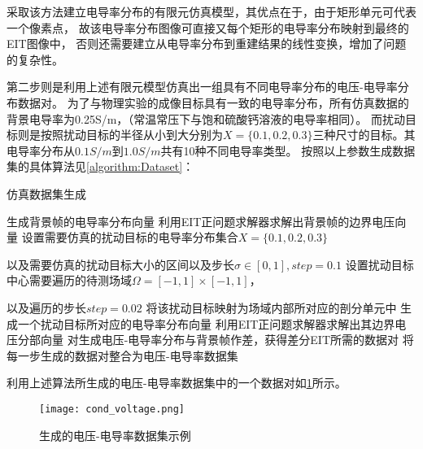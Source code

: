 采取该方法建立电导率分布的有限元仿真模型，其优点在于，由于矩形单元可代表一个像素点，
故该电导率分布图像可直接又每个矩形的电导率分布映射到最终的EIT图像中，
否则还需要建立从电导率分布到重建结果的线性变换，增加了问题的复杂性。

第二步则是利用上述有限元模型仿真出一组具有不同电导率分布的电压-电导率分布数据对。
为了与物理实验的成像目标具有一致的电导率分布，所有仿真数据的背景电导率为0.25S/m，（常温常压下与饱和硫酸钙溶液的电导率相同）。
而扰动目标则是按照扰动目标的半径从小到大分别为$ X = \{0.1, 0.2, 0.3\}$三种尺寸的目标。其电导率分布从$0.1S/m$到$1.0S/m$共有10种不同电导率类型。
按照以上参数生成数据集的具体算法见\cref{algorithm:Dataset}：

\begin{algorithm}[H]
    
    \caption{仿真数据集生成}
    \begin{algorithmic}[1]
        \State 生成背景帧的电导率分布向量
        \State 利用EIT正问题求解器求解出背景帧的边界电压向量
        \State 设置需要仿真的扰动目标的电导率分布集合$X = \{0.1, 0.2, 0.3\}$
        
        以及需要仿真的扰动目标大小的区间以及步长$\sigma \in \left[0, 1\right], step = 0.1$
        \State 设置扰动目标中心需要遍历的待测场域$\Omega = \left[-1, 1\right] \times \left[-1, 1\right]$，

        以及遍历的步长$step=0.02$
        \State 将该扰动目标映射为场域内部所对应的剖分单元中
        \State 生成一个扰动目标所对应的电导率分布向量
        \State 利用EIT正问题求解器求解出其边界电压分部向量
        \State 对生成电压-电导率分布与背景帧作差，获得差分EIT所需的数据对
        \EndFor
        \EndIf
       \EndFor
       \EndFor
       \State 将每一步生成的数据对整合为电压-电导率数据集
    \end{algorithmic}
    \label{algorithm:Dataset}
\end{algorithm}

利用上述算法所生成的电压-电导率数据集中的一个数据对如\cref{figure:cond_voltage}所示。

\begin{figure}[h]
    \centering
    \texttt{[image: cond\_voltage.png]}
    \caption{生成的电压-电导率数据集示例}
    \label{figure:cond_voltage}
\end{figure}

